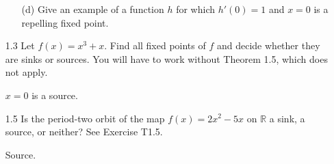 \documentclass[12pt,letterpaper,reqno]{amsart}
\newcommand{\R}{\mathbb R}
\begin{document}
\begin{enumerate}
\begin{enumerate}
\begin{flushleft}
\end{flushleft}
\item[(d)] Give an example of a function $h$ for which $h'(0) = 1$ and $x=0$ is a repelling fixed point.
\begin{flushleft}

\end{flushleft}
\end{enumerate}

\item [1.3] Let $f(x) = x^3 + x$. Find all fixed points of $f$ and decide whether they are sinks or sources. You will have to work without Theorem 1.5, which does not apply.
\begin{flushleft}
$x=0$ is a source.
\end{flushleft}

\item [1.5] Is the period-two orbit of the map $f(x) = 2x^2 - 5x$ on $\R$ a sink, a source, or neither? See Exercise T1.5.
\begin{flushleft}
Source.
\end{flushleft}

\end{enumerate}
\end{document}
